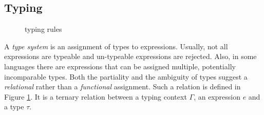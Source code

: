 {%
\subsection{Typing}\label{ssec:intro:typing}

\begin{figure}[t]
  \centering
  \caption{\stlcbool typing rules}
  \label{fig:intro:stlcbooltyping}
\end{figure}

A \emph{type system} is an assignment of types to expressions. Usually, not all
expressions are typeable and un-typeable expressions are rejected. Also, in some
languages there are expressions that can be assigned multiple, potentially
incomparable types. Both the partiality and the ambiguity of types suggest a
\emph{relational} rather than a \emph{functional} assignment. Such a relation is
defined in Figure \ref{fig:intro:stlcbooltyping}. It is a ternary relation
 between a typing context $\Gamma$,
an expression $e$ and a type $\tau$.

}
